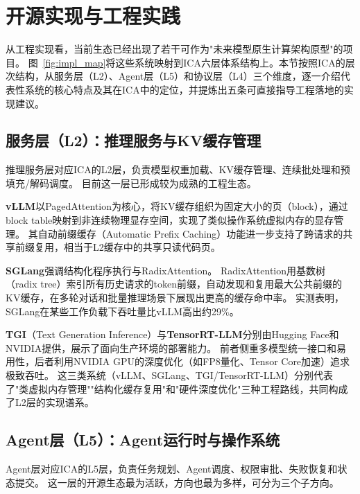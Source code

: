 \section{开源实现与工程实践}
\label{sec:implementation}

从工程实现看，当前生态已经出现了若干可作为"未来模型原生计算架构原型"的项目。
图~\ref{fig:impl_map}将这些系统映射到ICA六层体系结构上。本节按照ICA的层次结构，从服务层（L2）、Agent层（L5）和协议层（L4）三个维度，逐一介绍代表性系统的核心特点及其在ICA中的定位，并提炼出五条可直接指导工程落地的实现建议。



\subsection{服务层（L2）：推理服务与KV缓存管理}
\label{sec:impl-serving}

推理服务层对应ICA的L2层，负责模型权重加载、KV缓存管理、连续批处理和预填充/解码调度。
目前这一层已形成较为成熟的工程生态。

\textbf{vLLM}以PagedAttention为核心，将KV缓存组织为固定大小的页（block），通过block table映射到非连续物理显存空间，实现了类似操作系统虚拟内存的显存管理\cite{kwon2023pagedattention,vllm_docs_2026}。
其自动前缀缓存（Automatic Prefix Caching）功能进一步支持了跨请求的共享前缀复用，相当于L2缓存中的共享只读代码页\cite{vllm_prefix_2026}。

\textbf{SGLang}强调结构化程序执行与RadixAttention\cite{sglang2024,sglang_docs_2026}。
RadixAttention用基数树（radix tree）索引所有历史请求的token前缀，自动发现和复用最大公共前缀的KV缓存，在多轮对话和批量推理场景下展现出更高的缓存命中率。
实测表明，SGLang在某些工作负载下吞吐量比vLLM高出约29\%\cite{sglang2024}。

\textbf{TGI}（Text Generation Inference）与\textbf{TensorRT-LLM}分别由Hugging Face和NVIDIA提供，展示了面向生产环境的部署能力\cite{tgi_docs_2026,tensorrtllm_docs_2026}。
前者侧重多模型统一接口和易用性，后者利用NVIDIA GPU的深度优化（如FP8量化、Tensor Core加速）追求极致吞吐。
这三类系统（vLLM、SGLang、TGI/TensorRT-LLM）分别代表了"类虚拟内存管理""结构化缓存复用"和"硬件深度优化"三种工程路线，共同构成了L2层的实现谱系。

\subsection{Agent层（L5）：Agent运行时与操作系统}
\label{sec:impl-agent}

Agent层对应ICA的L5层，负责任务规划、Agent调度、权限审批、失败恢复和状态提交。
这一层的开源生态最为活跃，方向也最为多样，可分为三个子方向。

